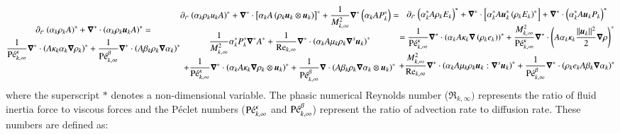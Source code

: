 \documentclass[preprint,10pt]{elsarticle}
\begin{document}
\begin{enumerate}
\begin{subequations}
\begin{multline}
\partial_{t^*} \left( \alpha_k \rho_k A \right)^* + \grad^* \cdot \left( \alpha_k \rho_k \mbold u_k A \right)^* = \\ \frac{1}{\Pe^\kappa_{k,\infty}}\grad^* \cdot \left(A 
\kappa_k \alpha_k \grad \rho_k \right)^* +
\frac{1}{\Pe_{k,\infty}^\beta} \grad^* \cdot \left( A \beta_k \rho_k \grad \alpha_k \right)^*
\end{multline}
%
\begin{multline}\label{eq:sev_equ-with-diss-terms-mom_case_one_scaled}
\partial_{t^*} \left( \alpha_k \rho_k u_k A \right)^* + \grad^* \cdot \left[ \alpha_k A \left( \rho_k \mbold u_k \otimes \mbold u_k\right)\right]^* + \frac{1}{M^2_{k,
\infty}}\grad^* \left( \alpha_k A P_k^* \right) = \\
  \frac{1}{M^2_{k,\infty}} \alpha_k^* P^*_k \grad^* A^*  
+ \frac{1}{\Re_{k,\infty}}\grad^* \cdot \left( \alpha_k A \mu_k \rho_k \grad^s \mbold u_k \right)^* \\ 
+ \frac{1}{\Pe_{k,\infty}^\kappa} \grad^* \cdot\left( \alpha_k A \kappa_k \grad \rho_k \otimes \mbold u_k \right)^* 
+ \frac{1}{\Pe_{k,\infty}^\beta} \grad \cdot \left( A \beta_k \rho_k \grad \alpha_k \otimes \mbold u_k \right)^*
\end{multline}
%
\begin{multline}\label{eq:sev_equ-with-diss-terms-ener_case_one_scaled}
\partial_{t^*} \left( \alpha_k^* A \rho_k E_k \right)^* + \grad^* \cdot \left[ \alpha_k^* A \mbold u_k^*  \left( \rho_k E_k \right)^* \right] +  \grad^* \cdot 
\left(\alpha_k^* A \mbold u_k P_k \right)^*  \\ =
\frac{1}{\Pe_{k,\infty}^\kappa} \grad^* \cdot \left( \alpha_k A \kappa_k \grad \left( \rho_k e_k \right) \right)^* 
+ \frac{M^2_{k,\infty}}{\Pe_{k,\infty}^\kappa} \grad^* \cdot \left( A\alpha_k \kappa_k \frac{||\mbold u_k||^2}{2} \grad \rho \right)^*  \\
+ \frac{M^2_{k,\infty}}{\Re_{k,\infty}} \grad^* \cdot \left( \alpha_k A \mu_k \rho_k \mbold u_k : \grad^s \mbold u_k\right)^* 
+ \frac{1}{\Pe_{k,\infty}^\beta } \grad^*\cdot \left( \rho_k e_k A \beta_k \grad \alpha_k \right)^*
\end{multline}
%
\end{subequations}
%
where the superscript $*$ denotes a non-dimensional variable. The phasic numerical Reynolds number ($\Re_{k,\infty})$ represents the ratio of fluid inertia 
force to viscous forces and 
the P\'eclet numbers ($\textrm{P\'e}_{k,\infty}^\kappa$ and $\textrm{P\'e}_{k,\infty}^\beta$) represent the ratio of advection rate to diffusion rate. These numbers are defined as:

\end{enumerate}
\end{document}
